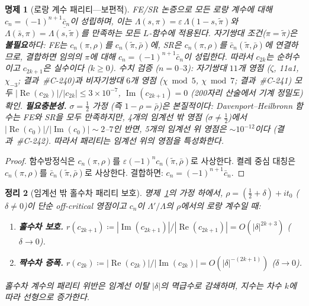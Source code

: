 \documentclass[11pt, a4paper]{article}
\theoremstyle{plain}
\newtheorem{theorem}{정리}
\newtheorem{proposition}[theorem]{명제}
\theoremstyle{definition}
\begin{document}
\begin{proposition}[로랑 계수 패리티---보편적]
\label{prop:laurentparity}
FE/SR 논증으로 \emph{모든} 로랑 계수에 대해
$c_n = (-1)^{n+1}\bar{c}_n$이 성립하며, 이는
$\Lambda(s,\pi)=\varepsilon\,\Lambda(1{-}s,\tilde{\pi})$와
$\Lambda(\bar{s},\pi)=\overline{\Lambda(s,\tilde{\pi})}$를 만족하는
\emph{모든} $L$-함수에 적용된다.
자기쌍대 조건($\pi=\tilde{\pi}$)은 \textbf{불필요}하다:
FE는 $c_n(\pi,\rho)$를 $c_n(\tilde{\pi},\bar{\rho})$에,
SR은 $c_n(\pi,\rho)$를 $\bar{c}_n(\tilde{\pi},\bar{\rho})$에
연결하므로, 결합하면 임의의 $\pi$에 대해
$c_n=(-1)^{n+1}\bar{c}_n$이 성립한다.
따라서 $c_{2k}$는 순허수이고 $c_{2k+1}$은 실수이다 ($k\geq 0$).
수치 검증 ($n=0$--$3$):
자기쌍대 $11$개 영점 ($\zeta$, 11a1, $\chi_{-3}$; 결과~\#C-240)과
비자기쌍대 $6$개 영점 ($\chi\bmod 5$, $\chi\bmod 7$;
결과~\#C-241) 모두 $|\!\operatorname{Re}(c_{2k})|/|c_{2k}|\leq
3\times 10^{-7}$, $\operatorname{Im}(c_{2k+1})=0$
(200자리 산술에서 기계 정밀도) 확인.
\textbf{필요충분성.}
$\sigma=\tfrac{1}{2}$ 가정 (즉 $1{-}\rho=\bar{\rho}$)은 본질적이다:
Davenport--Heilbronn 함수는 FE와 SR을 모두 만족하지만,
4개의 임계선 밖 영점 ($\sigma\neq\tfrac{1}{2}$)에서
$|\!\operatorname{Re}(c_0)|/|\!\operatorname{Im}(c_0)|\sim 2$--$7$인
반면, 5개의 임계선 위 영점은 $\sim 10^{-12}$이다 (결과~\#C-242).
따라서 패리티는 임계선 위의 영점을 특성화한다.
\end{proposition}

\begin{proof}
함수방정식은 $c_n(\pi,\rho)$를 $\varepsilon(-1)^n c_n(\tilde{\pi},\bar{\rho})$로 사상한다.
켤레 중심 대칭은 $c_n(\pi,\rho)$를 $\bar{c}_n(\tilde{\pi},\bar{\rho})$로 사상한다.
결합하면: $c_n = (-1)^{n+1}\bar{c}_n$.
\end{proof}

\begin{theorem}[임계선 밖 홀수차 패리티 보호]
\label{thm:parityprotection}
명제~\textup{\ref{prop:laurentparity}}의 가정 하에서,
$\rho=(\tfrac{1}{2}+\delta)+it_0$ ($\delta\neq 0$)이 단순 off-critical 영점이고
$c_n$이 $\Lambda'/\Lambda$의 $\rho$에서의 로랑 계수일 때:
\begin{enumerate}[label=\upshape(\alph*)]
\item \textbf{홀수차 보호.}
      $r(c_{2k+1})\coloneqq |\!\operatorname{Im}(c_{2k+1})|/|\!\operatorname{Re}(c_{2k+1})|
       = O(|\delta|^{2k+3})$ ($\delta\to 0$).
\item \textbf{짝수차 증폭.}
      $r(c_{2k})\coloneqq |\!\operatorname{Re}(c_{2k})|/|\!\operatorname{Im}(c_{2k})|
       = O(|\delta|^{-(2k+1)})$ ($\delta\to 0$).
\end{enumerate}
홀수차 계수의 패리티 위반은 임계선 이탈 $|\delta|$의 멱급수로 감쇄하며,
지수는 차수 $k$에 따라 선형으로 증가한다.
\end{theorem}
\end{document}
